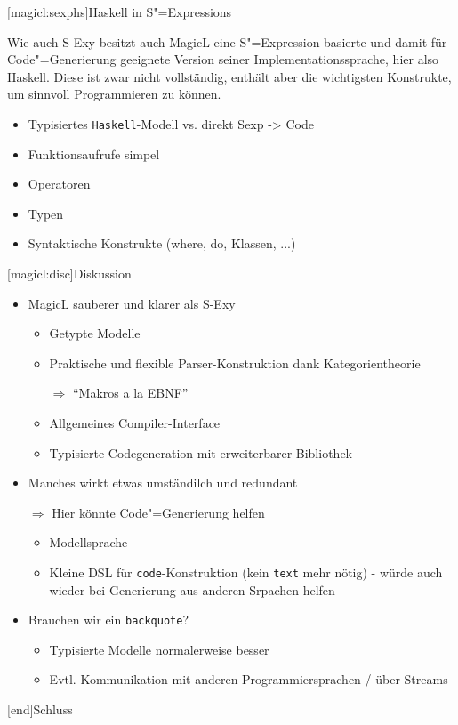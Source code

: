 \documentclass[a4paper, bibgerm]{book}
\newcommand\icode[1]{\lstinline?#1?}
\newcommand\lchapter{}
\newcommand\lsection{}
\newcommand{\sexy}{S-Exy}
\newcommand{\sexp}{S"=Expression}
\newcommand{\sexps}{S"=Expressions}
\newcommand{\cgen}{Code"=Generierung}
\begin{document}
\lsection[magicl:sexphs]{Haskell in \sexps{}}

Wie auch \sexy{} besitzt auch MagicL eine \sexp{}-basierte und damit für
\cgen{} geeignete Version seiner Implementationssprache, hier
also Haskell. Diese ist zwar nicht vollständig, enthält aber die
wichtigsten Konstrukte, um sinnvoll Programmieren zu können.

\begin{itemize}
\item Typisiertes \icode{Haskell}-Modell vs. direkt Sexp -> Code
\item Funktionsaufrufe simpel
\item Operatoren
\item Typen
\item Syntaktische Konstrukte (where, do, Klassen, ...)
\end{itemize}

\lsection[magicl:disc]{Diskussion}

  \begin{itemize}
  \item MagicL sauberer und klarer als \sexy{}
    \begin{itemize}
    \item Getypte Modelle
    \item Praktische und flexible Parser-Konstruktion dank Kategorientheorie
    \item[$\Rightarrow$] "`Makros a la EBNF"'
    \item Allgemeines Compiler-Interface
    \item Typisierte Codegeneration mit erweiterbarer Bibliothek
    \end{itemize}
  \item Manches wirkt etwas umständilch und redundant
  \item[$\Rightarrow$] Hier könnte \cgen{} helfen
    \begin{itemize}
    \item Modellsprache
    \item Kleine DSL für \icode{code}-Konstruktion (kein \icode{text}
      mehr nötig) - würde auch wieder bei Generierung aus anderen
      Srpachen helfen
    \end{itemize}
  \item Brauchen wir ein \icode{backquote}?
    \begin{itemize}
    \item Typisierte Modelle normalerweise besser
    \item Evtl. Kommunikation mit anderen Programmiersprachen / über Streams
    \end{itemize}
  \end{itemize}
\lchapter[end]{Schluss}
\end{document}
